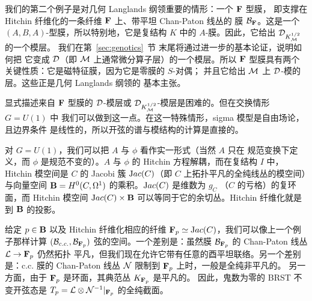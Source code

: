 我们的第二个例子是对几何 Langlands 纲领重要的情形：一个 $\CMF$ 型膜，
即支撑在 Hitchin 纤维化的一条纤维 $\CMF$ 上、带平坦 Chan-Paton 线丛的
膜 ${\cal B}_{\CMF}$。这是一个 $(A,B,A)$-型膜，所以特别地，它是复结构
$K$ 中的 $A$-膜。因此，它给出 ${\cal D}_{K_{ \EUM}^{1/2}}$ 的一个模层。
我们在第~\ref{sec:genotics}~节 末尾将通过进一步的基本论证，说明如何把
它变成 $\cal D$（即 $\M$ 上通常微分算子层）的一个模层。所以
$\CMF$ 型膜具有两个关键性质：它是磁特征膜，因为它是零膜的 $S$-对偶；
并且它给出 $\M$ 上 ${\cal D}$-模的层。这些正是几何 Langlands 纲领的
基本主张。

显式描述来自 $\CMF$ 型膜的 ${\cal D}$-模层或
${\cal D}_{K_{ \EUM}^{1/2}}$-模层是困难的。但在交换情形 $G=U(1)$ 中
我们可以做到这一点。在这一特殊情形，sigma 模型是自由场论，且边界条件
是线性的，所以开弦的谱与模结构的计算是直接的。

对 $G=U(1)$，我们可以把 $A$ 与 $\phi$ 看作实一形式（当然 $A$ 只在
规范变换下定义，而 $\phi$ 是规范不变的）。$A$ 与 $\phi$ 的 Hitchin
方程解耦，而在复结构 $I$ 中，Hitchin 模空间是 $C$ 的 Jacobi 簇
${\rm Jac}(C)$（即 $C$ 上拓扑平凡的全纯线丛的模空间）与向量空间
${\EUBB}=H^0(C,\Omega^1)$ 的乘积。${\rm Jac}(C)$ 是维数为 $g_C$
（$C$ 的亏格）的复环面，而 Hitchin 模空间
${\rm Jac}(C)\times {\EUBB}$ 可以等同于它的余切丛。Hitchin 纤维化就是
到 ${\EUBB}$ 的投影。

给定 $p\in {\EUBB}$ 以及 Hitchin 纤维化相应的纤维
${\CMF}_p\simeq {\rm Jac}(C)$，我们可以像上一个例子那样计算
$({\cal B}_{c.c.},{\cal B}_{{\CMF}_p})$ 弦的空间。一个差别是：虽然膜
${\cal B}_{{\CMF}_p}$ 的 Chan-Paton 线丛 $\cL\to{\CMF}_p$ 仍然拓扑
平凡，但我们现在允许它带有任意的酉平坦联络。另一个差别是：c.c. 膜的
Chan-Paton 线丛 ${\cal N}$ 限制到 ${\CMF}_p$ 上时，一般是全纯非平凡的。
另一方面，由于 ${\CMF}_p$ 是环面，其典范丛 $K_{{\CMF}_p}$ 是平凡的。
因此，鬼数为零的 BRST 不变开弦态是
$T_p=\cL\otimes {\cal N}^{-1}\vert_{{\CMF}_p}$ 的全纯截面。

